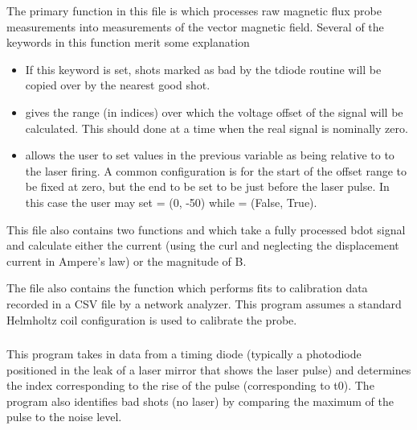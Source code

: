 The primary function in this file is  which processes raw magnetic flux probe measurements into measurements of the vector magnetic field. Several of the keywords in this function merit some explanation

\begin{itemize}
\item {} If this keyword is set, shots marked as bad by the tdiode routine will be copied over by the nearest good shot.

\item {} gives the range (in indices) over which the voltage offset of the signal will be calculated. This should done at a time when the real signal is nominally zero. 

\item {} allows the user to set values in the previous variable as being relative to to the laser firing. A common configuration is for the start of the offset range to be fixed at zero, but the end to be set to be just before the laser pulse. In this case the user may set  = (0, -50) while  = (False, True). 
\end{itemize}

This file also contains two functions  and  which take a fully processed bdot signal and calculate either the current (using the curl and neglecting the displacement current in Ampere's law) or the magnitude of B. 

The file also contains the  function which performs fits to calibration data recorded in a CSV file by a network analyzer. This program assumes a standard Helmholtz coil configuration is used to calibrate the probe. 


\subsubsection{}

This program takes in data from a timing diode (typically a photodiode positioned in the leak of a laser mirror that shows the laser pulse) and determines the index corresponding to the rise of the pulse (corresponding to t0). The program also identifies bad shots (no laser) by comparing the maximum of the pulse to the noise level. 


